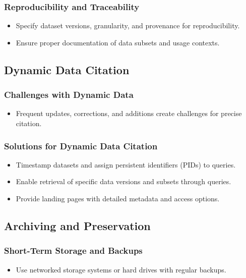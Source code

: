 \subsubsection{Reproducibility and Traceability}
\begin{itemize}
    \item Specify dataset versions, granularity, and provenance for reproducibility.
    \item Ensure proper documentation of data subsets and usage contexts.
\end{itemize}

\subsection{Dynamic Data Citation}
\subsubsection{Challenges with Dynamic Data}
\begin{itemize}
    \item Frequent updates, corrections, and additions create challenges for precise citation.
\end{itemize}

\subsubsection{Solutions for Dynamic Data Citation}
\begin{itemize}
    \item Timestamp datasets and assign persistent identifiers (PIDs) to queries.
    \item Enable retrieval of specific data versions and subsets through queries.
    \item Provide landing pages with detailed metadata and access options.
\end{itemize}

\subsection{Archiving and Preservation}
\subsubsection{Short-Term Storage and Backups}
\begin{itemize}
    \item Use networked storage systems or hard drives with regular backups.
\end{itemize}

